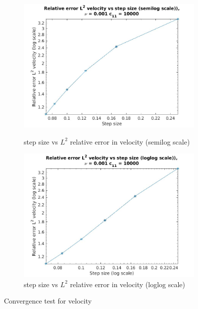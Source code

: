 \documentclass[a4paper,oneside,openright,spanish,english]{book}
\begin{document}
\begin{figure}
\begin{subfigure}{\textwidth}	
  \includegraphics[width=\linewidth]{step_size_vs_velocity_l2_error_semilog.jpg}
  \caption{step size vs $L^2$ relative error in velocity (semilog scale)} 
  \label{step_size_vs_velocity_l2_error_semilog}
  \includegraphics[width=\linewidth]{step_size_vs_velocity_l2_error_loglog.jpg}
  \caption{step size vs $L^2$ relative error in velocity (loglog scale)} 
  \label{step_size_vs_velocity_l2_error_loglog}
\end{subfigure}
\caption{Convergence test for velocity}
\label{convergence_check_velocity}
\end{figure}
\end{document}
